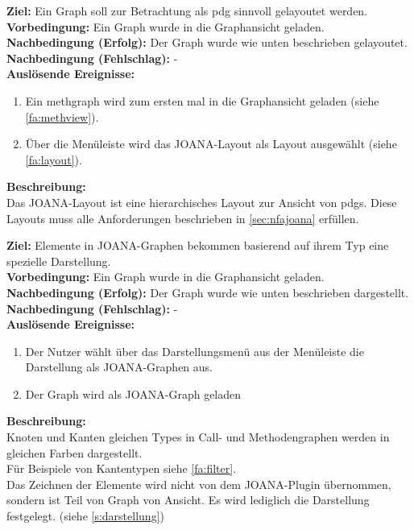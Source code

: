 \label{fa:joanalayout}
\textbf{Ziel:} Ein Graph soll zur Betrachtung als \gls{pdg} sinnvoll gelayoutet werden.\\
\textbf{Vorbedingung:} Ein Graph wurde in die Graphansicht geladen.\\
\textbf{Nachbedingung (Erfolg):} Der Graph wurde wie unten beschrieben gelayoutet.\\
\textbf{Nachbedingung (Fehlschlag):} -\\
\textbf{Auslösende Ereignisse:}
\begin{enumerate}[nolistsep, label=(\alph*)]
  \item Ein \gls{methgraph} wird zum ersten mal in die Graphansicht geladen (siehe \ref{fa:methview}).
  \item Über die Menüleiste wird das JOANA-Layout als Layout ausgewählt (siehe \ref{fa:layout}).
\end{enumerate}
\textbf{Beschreibung:}\\
Das JOANA-Layout ist eine hierarchisches Layout zur Ansicht von \glspl{pdg}.
Diese Layouts muss alle Anforderungen beschrieben in \ref{sec:nfajoana} erfüllen.

\label{fa:joanaview}
\textbf{Ziel:} Elemente in JOANA-Graphen bekommen basierend auf ihrem Typ eine spezielle Darstellung.\\
\textbf{Vorbedingung:} Ein Graph wurde in die Graphansicht geladen.\\
\textbf{Nachbedingung (Erfolg):} Der Graph wurde wie unten beschrieben dargestellt.\\
\textbf{Nachbedingung (Fehlschlag):} -\\
\textbf{Auslösende Ereignisse:}
\begin{enumerate}[nolistsep, label=(\alph*)]
  \item Der Nutzer wählt über das Darstellungsmenü aus der Menüleiste die Darstellung als JOANA-Graphen aus.
  \item Der Graph wird als JOANA-Graph geladen
\end{enumerate}
\textbf{Beschreibung:}\\
Knoten und Kanten gleichen Types in Call- und Methodengraphen werden in gleichen Farben dargestellt.\\
Für Beispiele von Kantentypen siehe \ref{fa:filter}.\\
Das Zeichnen der Elemente wird nicht von dem JOANA-Plugin übernommen, sondern ist Teil von Graph von Ansicht. %
Es wird lediglich die Darstellung festgelegt. (siehe \ref{s:darstellung})


